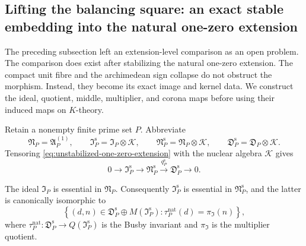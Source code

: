 \subsection{Lifting the balancing square: an exact stable embedding into the
natural one-zero extension}
\label{subsec:stable-to-natural-extension}

The preceding subsection left an extension-level comparison as an open
problem.  The comparison does exist after stabilizing the natural one-zero
extension.  The compact unit fibre and the archimedean sign collapse do not
obstruct the morphism.  Instead, they become its exact image and kernel data.
We construct the ideal, quotient, middle, multiplier, and corona maps before
using their induced maps on $K$-theory.

Retain a nonempty finite prime set $P$.  Abbreviate
\[
 \mathfrak N_P=\mathfrak A_P^{(1)},\qquad
 \mathfrak I_P^{\mathrm s}=\mathfrak I_P\otimes\mathcal K,\qquad
 \mathfrak N_P^{\mathrm s}=\mathfrak N_P\otimes\mathcal K,\qquad
 \mathfrak D_P^{\mathrm s}=\mathfrak D_P\otimes\mathcal K.
\]
Tensoring \eqref{eq:unstabilized-one-zero-extension} with the nuclear algebra
$\mathcal K$ gives
\begin{equation}
 0\longrightarrow\mathfrak I_P^{\mathrm s}
 \longrightarrow\mathfrak N_P^{\mathrm s}
 \xrightarrow{q_P^{\mathrm s}}\mathfrak D_P^{\mathrm s}
 \longrightarrow0.
 \label{eq:natural-one-zero-stabilized-extension}
\end{equation}

\begin{lemma}
\label{lem:natural-one-zero-essential-pullback}
The ideal $\mathfrak I_P$ is essential in $\mathfrak N_P$.  Consequently
$\mathfrak I_P^{\mathrm s}$ is essential in
$\mathfrak N_P^{\mathrm s}$, and the latter is canonically isomorphic to
\begin{equation}
 \left\{(d,n)\in\mathfrak D_P^{\mathrm s}
       \oplus M(\mathfrak I_P^{\mathrm s}):
       \tau_P^{\mathrm{nat}}(d)=\pi_{\mathfrak I}(n)\right\},
 \label{eq:natural-one-zero-busby-pullback}
\end{equation}
where
$\tau_P^{\mathrm{nat}}:\mathfrak D_P^{\mathrm s}
\to Q(\mathfrak I_P^{\mathrm s})$ is the Busby invariant and
$\pi_{\mathfrak I}$ is the multiplier quotient.
\end{lemma}

